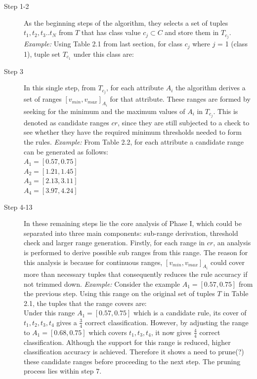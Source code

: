\begin{description}
\item[Step 1-2] As the beginning steps of the algorithm, they selects a set of tuples $t_1, t_2, t_3..t_N$ from $T$ that has class value $c_j \subset C$ and store them in $T_{c_j}$. \\
\textit{Example: } Using Table 2.1 from last section, for class $c_j$ where $j$ = 1 (class 1), tuple set $T_{c_1}$ under this class are: \\

 

\item[Step 3] In this single step, from $T_{c_j}$, for each attribute $A_i$ the algorithm derives a set of ranges $[v_{min}, v_{max}]_{A_i}$ for that attribute. These ranges are formed by seeking for the minimum and the maximum values of $A_i$ in $T_{c_j}$. This is denoted as candidate ranges $cr$, since they are still subjected to a check to see whether they have the required minimum thresholds needed to form the rules. 
\textit{Example: } From Table 2.2, for each attribute a candidate range can be generated as follows: \\
$A_1 = [0.57, 0.75]$ \\
$A_2 = [1.21, 1.45]$ \\
$A_3 = [2.13, 3.11]$ \\ 
$A_4 = [3.97, 4.24]$ \\

\item[Step 4-13] In these remaining steps lie the core analysis of Phase I, which could be separated into three main components: sub-range derivation, threshold check and larger range generation. Firstly, for each range in $cr$, an analysis is performed to derive possible sub ranges from this range. The reason for this analysis is because for continuous ranges, $[v_{min}, v_{max}]_{A_i}$ could cover more than necessary tuples that consequently reduces the rule accuracy if not trimmed down. 
\textit{Example: } Consider the example $A_1 = [0.57, 0.75]$ from the previous step. Using this range on the original set of tuples $T$ in Table 2.1, the tuples that the range covers are: \\



Under this range $A_1 = [0.57, 0.75]$ which is a candidate rule, its cover of ${t_1,t_2,t_3,t_4}$ gives a $\frac{3}{4}$ correct classification. However, by adjusting the range to $A_1 = [0.68, 0.75]$ which covers ${t_1,t_3,t_4}$, it now gives $\frac{4}{4}$ correct classification. Although the support for this range is reduced, higher classification accuracy is achieved. Therefore it shows a need to prune(?) these candidate ranges before proceeding to the next step. The pruning process lies within step 7. \\


\end{description}
